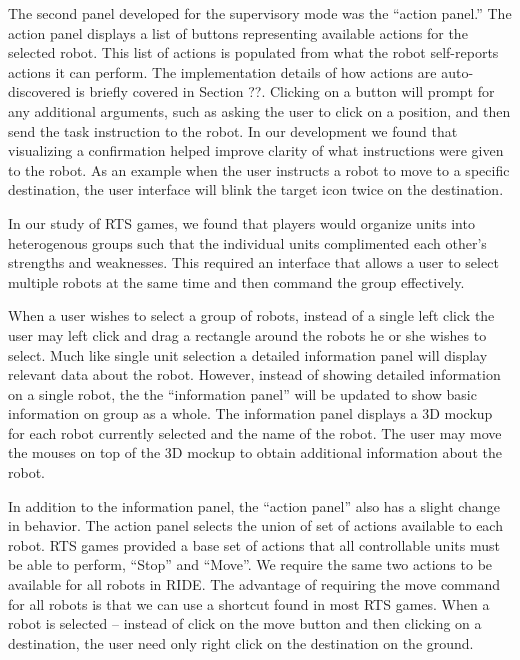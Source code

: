 The second panel developed for the supervisory mode was the ``action panel.'' The action panel displays a list of buttons representing available actions for the selected robot. This list of actions is populated from what the robot self-reports actions it can perform. The implementation details of how actions are auto-discovered is briefly covered in Section ??. Clicking on a button will prompt for any additional arguments, such as asking the user to click on a position, and then send the task instruction to the robot. In our development we found that visualizing a confirmation helped improve clarity of what instructions were given to the robot. As an example when the user instructs a robot to move to a specific destination, the user interface will blink the target icon twice on the destination.  

In our study of RTS games, we found that players would organize units into heterogenous groups such that the individual units complimented each other's strengths and weaknesses. This required an interface that allows a user to select multiple robots at the same time and then command the group effectively.

When a user wishes to select a group of robots, instead of a single left click the user may left click and drag a rectangle around the robots he or she wishes to select. Much like single unit selection a detailed information panel will display relevant data about the robot. However, instead of showing detailed information on a single robot, the the ``information panel'' will be updated to show basic information on group as a whole. The information panel displays a 3D mockup for each robot currently selected and the name of the robot. The user may move the mouses on top of the 3D mockup to obtain additional information about the robot.

In addition to the information panel, the ``action panel'' also has a slight change in behavior. The action panel selects the union of set of actions available to each robot. RTS games provided a base set of actions that all controllable units must be able to perform, ``Stop'' and ``Move''. We require the same two actions to be available for all robots in RIDE. The advantage of requiring the move command for all robots is that we can use a shortcut found in most RTS games. When a robot is selected -- instead of click on the move button and then clicking on a destination, the user need only right click on the destination on the ground.


% 
% 
% 
% 
